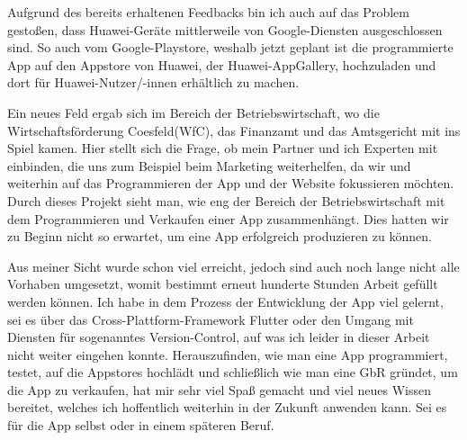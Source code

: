 Aufgrund des bereits erhaltenen Feedbacks bin ich auch auf das Problem gestoßen, dass Huawei-Geräte mittlerweile von Google-Diensten ausgeschlossen sind.
So auch vom Google-Playstore, weshalb jetzt geplant ist die programmierte App auf den Appstore von Huawei, der Huawei-AppGallery, hochzuladen und dort
für Huawei-Nutzer/-innen erhältlich zu machen.

Ein neues Feld ergab sich im Bereich der Betriebswirtschaft, wo die Wirtschaftsförderung Coesfeld(WfC),
das Finanzamt und das Amtsgericht mit ins Spiel kamen. Hier stellt sich die Frage, ob mein Partner und ich Experten 
mit einbinden, die uns zum Beispiel beim Marketing weiterhelfen, da wir und weiterhin auf das Programmieren der App und der
Website fokussieren möchten. Durch dieses Projekt sieht man, wie eng der Bereich der Betriebswirtschaft mit dem Programmieren und Verkaufen einer
App zusammenhängt. Dies hatten wir zu Beginn nicht so erwartet, um eine App erfolgreich produzieren zu können.

Aus meiner Sicht wurde schon viel erreicht, jedoch sind auch noch lange nicht alle Vorhaben 
umgesetzt, womit bestimmt erneut hunderte Stunden Arbeit gefüllt werden können. Ich habe in dem Prozess der Entwicklung der App viel gelernt, sei es 
über das Cross-Plattform-Framework Flutter oder den Umgang mit Diensten für sogenanntes Version-Control, auf was ich leider in dieser Arbeit nicht weiter eingehen konnte.
Herauszufinden, wie man eine App programmiert, testet, auf die Appstores hochlädt und schließlich wie man eine GbR gründet, um die App zu verkaufen,
hat mir sehr viel Spaß gemacht und viel neues Wissen bereitet, welches ich hoffentlich weiterhin in der Zukunft anwenden kann. Sei es für die 
App selbst oder in einem späteren Beruf.